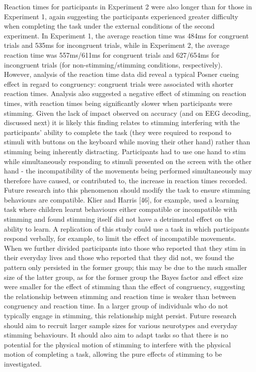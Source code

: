 \documentclass[
  letterpaper,
  DIV=11,
  numbers=noendperiod]{scrartcl}
\begin{document}
Reaction times for participants in Experiment 2 were also longer than
for those in Experiment 1, again suggesting the participants experienced
greater difficulty when completing the task under the external
conditions of the second experiment. In Experiment 1, the average
reaction time was 484ms for congruent trials and 535ms for incongruent
trials, while in Experiment 2, the average reaction time was 557ms/611ms
for congruent trials and 627/654ms for incongruent trials (for
non-stimming/stimming conditions, respectively). However, analysis of
the reaction time data did reveal a typical Posner cueing effect in
regard to congruency: congruent trials were associated with shorter
reaction times. Analysis also suggested a negative effect of stimming on
reaction times, with reaction times being significantly slower when
participants were stimming. Given the lack of impact observed on
accuracy (and on EEG decoding, discussed next) it is likely this finding
relates to stimming interfering with the participants' ability to
complete the task (they were required to respond to stimuli with buttons
on the keyboard while moving their other hand) rather than stimming
being inherently distracting. Participants had to use one hand to stim
while simultaneously responding to stimuli presented on the screen with
the other hand - the incompatibility of the movements being performed
simultaneously may therefore have caused, or contributed to, the
increase in reaction times recorded. Future research into this
phenomenon should modify the task to ensure stimming behaviours are
compatible. Klier and Harris {[}46{]}, for example, used a learning task
where children learnt behaviours either compatible or incompatible with
stimming and found stimming itself did not have a detrimental effect on
the ability to learn. A replication of this study could use a task in
which participants respond verbally, for example, to limit the effect of
incompatible movements. When we further divided participants into those
who reported that they stim in their everyday lives and those who
reported that they did not, we found the pattern only persisted in the
former group; this may be due to the much smaller size of the latter
group, as for the former group the Bayes factor and effect size were
smaller for the effect of stimming than the effect of congruency,
suggesting the relationship between stimming and reaction time is weaker
than between congruency and reaction time. In a larger group of
individuals who do not typically engage in stimming, this relationship
might persist. Future research should aim to recruit larger sample sizes
for various neurotypes and everyday stimming behaviours. It should also
aim to adapt tasks so that there is no potential for the physical motion
of stimming to interfere with the physical motion of completing a task,
allowing the pure effects of stimming to be investigated.
\end{document}
